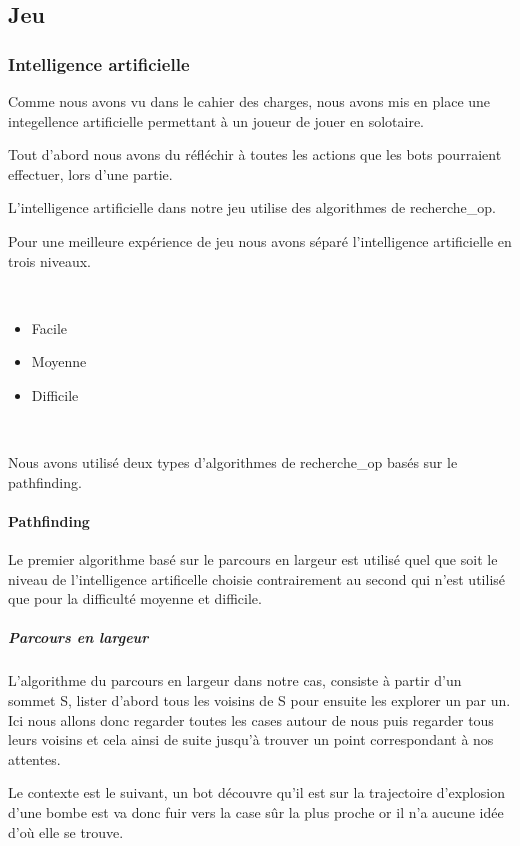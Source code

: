 \subsection{Jeu}
	\subsubsection{Intelligence artificielle}
		Comme nous avons vu dans le cahier des charges, nous avons mis en place une integellence artificielle permettant à un joueur de jouer en solotaire.
	
		Tout d'abord nous avons du réfléchir à toutes les actions que les bots pourraient effectuer, lors d'une partie.
		
		
		L'intelligence artificielle dans notre jeu utilise des algorithmes de \gls{recherche_op}.
		
		Pour une meilleure expérience de jeu nous avons séparé l'intelligence artificielle en trois niveaux.
		
		$\,$
		
		\begin{itemize}
		  \item Facile
		  \item Moyenne
		  \item Difficile
		\end{itemize}
		
		$\,$
		
		Nous avons utilisé deux types d'algorithmes de \gls{recherche_op} basés sur le \gls{pathfinding}.
		
		\paragraph{Pathfinding}
		
			Le premier algorithme basé sur le parcours en largeur est utilisé quel que soit
			le niveau de l'intelligence artificelle choisie contrairement au second qui n'est utilisé
			que pour la difficulté moyenne et difficile.
		
		\subparagraph{Parcours en largeur\\}
		
			L'algorithme du parcours en largeur dans notre cas, consiste à partir d'un sommet S,
			lister d'abord tous les voisins de S pour ensuite les explorer un par un.
			Ici nous allons donc regarder toutes les cases autour de nous puis regarder
			tous leurs voisins et cela ainsi de suite jusqu'à trouver un point
			correspondant à nos attentes.
			
			Le contexte est le suivant, un \gls{bot} découvre qu'il est sur la trajectoire
			d'explosion d'une bombe est va donc fuir vers la case sûr la plus proche or
			il n'a aucune idée d'où elle se trouve.
			

